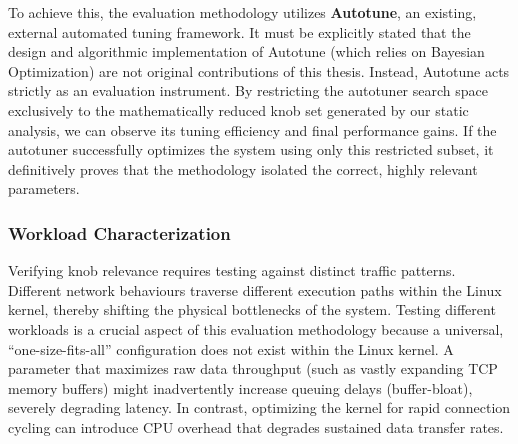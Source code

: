 To achieve this, the evaluation methodology utilizes \textbf{Autotune}, an existing, external automated tuning framework.
It must be explicitly stated that the design and algorithmic implementation of Autotune (which relies on Bayesian Optimization) are not original contributions of this thesis.
Instead, Autotune acts strictly as an evaluation instrument.
By restricting the autotuner search space exclusively to the mathematically reduced knob set generated by our static analysis, we can observe its tuning efficiency and final performance gains.
If the autotuner successfully optimizes the system using only this restricted subset, it definitively proves that the methodology isolated the correct, highly relevant parameters.

\subsubsection{Workload Characterization} \label{subsec:methodology_workload}

Verifying knob relevance requires testing against distinct traffic patterns.
Different network behaviours traverse different execution paths within the Linux kernel, thereby shifting the physical bottlenecks of the system.
Testing different workloads is a crucial aspect of this evaluation methodology because a universal, ``one-size-fits-all'' configuration does not exist within the Linux kernel.
A parameter that maximizes raw data throughput (such as vastly expanding TCP memory buffers) might inadvertently increase queuing delays (buffer-bloat), severely degrading latency.
In contrast, optimizing the kernel for rapid connection cycling can introduce CPU overhead that degrades sustained data transfer rates.

